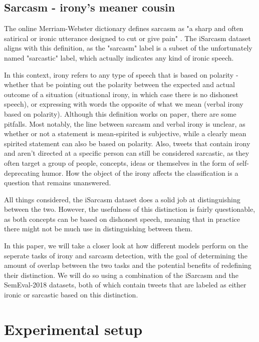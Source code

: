 \documentclass[10pt, a4paper]{article}
\begin{document}
 
\subsection{Sarcasm - irony's meaner cousin}\label{sec:sarcasm_definition}
The online Merriam-Webster dictionary defines sarcasm as "a sharp and often satirical or ironic utterance designed to 
cut or give pain" \citep{mw-dictionary}. The iSarcasm dataset \citep{iSarcasm} aligns with this definition, as 
the "sarcasm" label is a subset of the unfortunately named "sarcastic" label, which actually 
indicates any kind of ironic speech. 

In this context, irony refers to any type of speech that is based on polarity - whether that be pointing out the polarity 
between the expected and actual outcome of a situation (situational irony, in which case there is no dishonest speech), or expressing with words the opposite of what 
we mean (verbal irony based on polarity). Although this definition works on paper, there are some pitfalls. Most notably, 
the line between sarcasm and verbal irony is unclear, as whether or not a statement is mean-spirited is subjective, while 
a clearly mean spirited statement can also be based on polarity. Also, tweets that contain irony and aren’t directed at a 
specific person can still be considered sarcastic, as they often target a group of people, concepts, ideas or themselves 
in the form of self-deprecating humor. How the object of the irony affects the classification is a question that remains unanswered.

All things considered, the iSarcasm \citep{iSarcasm} dataset
does a solid job at distinguishing between the two. However, the usefulness of this distinction is fairly questionable, 
as both concepts can be based on dishonest speech, meaning that in practice there might not be much use in distinguishing
 between them.

In this paper, we will take a closer look at how different models perform on the seperate tasks of irony and sarcasm detection,
with the goal of determining the amount of overlap between the two tasks and the potential benefits of redefining their distinction.
We will do so using a combination of the iSarcasm \citep{iSarcasm} and the SemEval-2018 \citep{semeval-2018} 
datasets, both of which contain tweets that are labeled as either ironic or sarcastic based on this distinction.

\section{Experimental setup}
\end{document}
